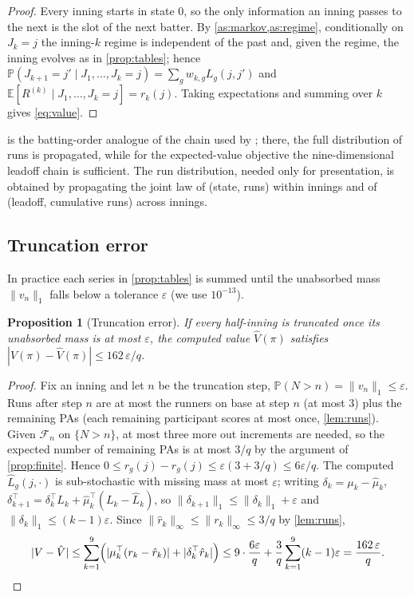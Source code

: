 \documentclass[11pt]{article}
\newtheorem{proposition}[theorem]{Proposition}
\theoremstyle{definition}
\theoremstyle{remark}
\newcommand{\E}{\mathbb{E}}
\renewcommand{\P}{\mathbb{P}}
\begin{document}
\begin{proof}
Every inning starts in state 0, so the only information an inning passes to the next is the
slot of the next batter. By \cref{as:markov,as:regime}, conditionally on $J_k=j$ the inning-$k$
regime is independent of the past and, given the regime, the inning evolves as in
\cref{prop:tables}; hence $\P(J_{k+1}=j'\mid J_1,\dots,J_k=j)=\sum_gw_{k,g}L_g(j,j')$ and
$\E[R^{(k)}\mid J_1,\dots,J_k=j]=r_k(j)$. Taking expectations and summing over $k$ gives
\eqref{eq:value}.
\end{proof}

 is the batting-order analogue of the chain used by \citet{bukiet1997}; there,
the full distribution of runs is propagated, while for the expected-value objective the
nine-dimensional leadoff chain is sufficient. The run distribution, needed only for presentation,
is obtained by propagating the joint law of (state, runs) within innings and of
(leadoff, cumulative runs) across innings.

\subsection{Truncation error}

In practice each series in \cref{prop:tables} is summed until the unabsorbed mass
$\|v_n\|_1$ falls below a tolerance $\varepsilon$ (we use $10^{-13}$).

\begin{proposition}[Truncation error]\label{prop:trunc}
If every half-inning is truncated once its unabsorbed mass is at most $\varepsilon$, the computed
value $\hat V(\pi)$ satisfies $|V(\pi)-\hat V(\pi)|\le 162\,\varepsilon/q$.
\end{proposition}

\begin{proof}
Fix an inning and let $n$ be the truncation step, $\P(N>n)=\|v_n\|_1\le\varepsilon$. Runs after step
$n$ are at most the runners on base at step $n$ (at most 3) plus the remaining PAs (each remaining
participant scores at most once, \cref{lem:runs}). Given $\mathcal{F}_n$ on $\{N>n\}$, at most three
more out increments are needed, so the expected number of remaining PAs is at most $3/q$ by the
argument of \cref{prop:finite}. Hence $0\le r_g(j)-\hat r_g(j)\le\varepsilon(3+3/q)\le6\varepsilon/q$.
The computed $\hat L_g(j,\cdot)$ is sub-stochastic with missing mass at most $\varepsilon$; writing
$\delta_k=\mu_k-\hat\mu_k$, $\delta_{k+1}^\top=\delta_k^\top L_k+\hat\mu_k^\top(L_k-\hat L_k)$, so
$\|\delta_{k+1}\|_1\le\|\delta_k\|_1+\varepsilon$ and $\|\delta_k\|_1\le(k-1)\varepsilon$. Since
$\|\hat r_k\|_\infty\le\|r_k\|_\infty\le3/q$ by \cref{lem:runs},
\[
|V-\hat V|\le\sum_{k=1}^9\Bigl(|\mu_k^\top(r_k-\hat r_k)|+|\delta_k^\top\hat r_k|\Bigr)
\le 9\cdot\frac{6\varepsilon}{q}+\frac{3}{q}\sum_{k=1}^9(k-1)\varepsilon=\frac{162\,\varepsilon}{q}.\qedhere
\]
\end{proof}
\end{document}
